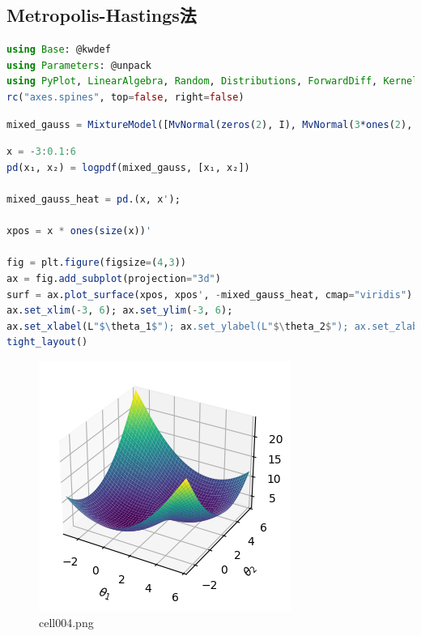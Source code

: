 \subsection{Metropolis-Hastings法}
\begin{lstlisting}[language=julia]
using Base: @kwdef
using Parameters: @unpack
using PyPlot, LinearAlgebra, Random, Distributions, ForwardDiff, KernelDensity
rc("axes.spines", top=false, right=false)
\end{lstlisting}
\begin{lstlisting}[language=julia]
mixed_gauss = MixtureModel([MvNormal(zeros(2), I), MvNormal(3*ones(2), I)], [0.5, 0.5]) # 分布を混ぜる
\end{lstlisting}
\begin{lstlisting}[language=julia]
x = -3:0.1:6
pd(x₁, x₂) = logpdf(mixed_gauss, [x₁, x₂])

mixed_gauss_heat = pd.(x, x');

xpos = x * ones(size(x))'

fig = plt.figure(figsize=(4,3))
ax = fig.add_subplot(projection="3d")
surf = ax.plot_surface(xpos, xpos', -mixed_gauss_heat, cmap="viridis")
ax.set_xlim(-3, 6); ax.set_ylim(-3, 6); 
ax.set_xlabel(L"$\theta_1$"); ax.set_ylabel(L"$\theta_2$"); ax.set_zlabel(L"$-\log p$"); 
tight_layout()
\end{lstlisting}
\begin{figure}[ht]
	\centering
	\includegraphics[scale=0.8, max width=\linewidth]{./fig/bayesian-brain/mcmc/cell004.png}
	\caption{cell004.png}
	\label{cell004.png}
\end{figure}
